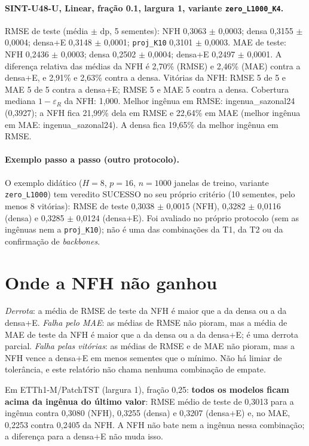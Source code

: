 \documentclass[11pt,a4paper]{article}
\begin{document}
\paragraph{SINT-U48-U, Linear, fração 0.1, largura 1, variante \texttt{zero\_\allowbreak{}L1000\_\allowbreak{}K4}.} RMSE de teste (média $\pm$ dp, 5 sementes): NFH 0,3063 $\pm$ 0,0003; densa 0,3155 $\pm$ 0,0004; densa+E 0,3148 $\pm$ 0,0001; \texttt{proj\_K10} 0,3101 $\pm$ 0,0003. MAE de teste: NFH 0,2436 $\pm$ 0,0003; densa 0,2502 $\pm$ 0,0004; densa+E 0,2497 $\pm$ 0,0001. A diferença relativa das médias da NFH é \textminus{}2,70\% (RMSE) e \textminus{}2,46\% (MAE) contra a densa+E, e \textminus{}2,91\% e \textminus{}2,63\% contra a densa. Vitórias da NFH: RMSE 5 de 5 e MAE 5 de 5 contra a densa+E; RMSE 5 e MAE 5 contra a densa. Cobertura mediana $1-\varepsilon_R$ da NFH: 1,000. 
Melhor ingênua em RMSE: ingenua\_sazonal24 (0,3927); a NFH fica \textminus{}21,99\% dela em RMSE e \textminus{}22,64\% em MAE (melhor ingênua em MAE: ingenua\_sazonal24). A densa fica \textminus{}19,65\% da melhor ingênua em RMSE.


\paragraph{Exemplo passo a passo (outro protocolo).} O exemplo didático ($H=8$, $p=16$, $n=1000$ janelas de treino, variante \texttt{zero\_\allowbreak{}L1000}) tem veredito SUCESSO no seu próprio critério (10 sementes, pelo menos 8 vitórias): RMSE de teste 0,3038 $\pm$ 0,0015 (NFH), 0,3282 $\pm$ 0,0116 (densa) e 0,3285 $\pm$ 0,0124 (densa+E). Foi avaliado no próprio protocolo (sem as ingênuas nem a \texttt{proj\_K10}); não é uma das combinações da T1, da T2 ou da confirmação de \emph{backbones}.

\section{Onde a NFH não ganhou}\label{sec:naoganhou}
\emph{Derrota}: a média de RMSE de teste da NFH é maior que a da densa ou a da densa+E. \emph{Falha pelo MAE}: as médias de RMSE não pioram, mas a média de MAE de teste da NFH é maior que a da densa ou a da densa+E; é uma derrota parcial. \emph{Falha pelas vitórias}: as médias de RMSE e de MAE não pioram, mas a NFH vence a densa+E em menos sementes que o mínimo. Não há limiar de tolerância, e este relatório não chama nenhuma combinação de empate.



Em ETTh1-M/PatchTST (largura 1), fração 0,25: \textbf{todos os modelos ficam acima da ingênua do último valor}: RMSE médio de teste de 0,3013 para a ingênua contra 0,3080 (NFH), 0,3255 (densa) e 0,3207 (densa+E) e, no MAE, 0,2253 contra 0,2405 da NFH. A NFH não bate nem a ingênua nessa combinação; a diferença para a densa+E não muda isso.
\end{document}
